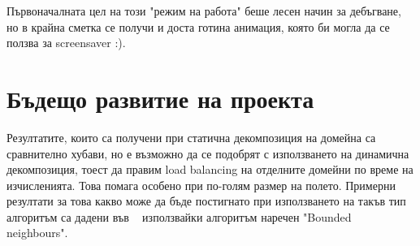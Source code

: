 \documentclass{article}
\begin{document}
Първоначалната цел на този "режим на работа" беше лесен начин за дебъгване,
но в крайна сметка се получи и доста готина анимация, която би могла да се ползва за screensaver :).

\section{Бъдещо развитие на проекта}
Резултатите, които са получени при статична декомпозиция на домейна са сравнително хубави,
но е възможно да се подобрят с използването на динамична декомпозиция, тоест да правим
load balancing на отделните домейни по време на изчисленията. Това помага особено при
по-голям размер на полето. Примерни резултати за това какво може да бъде постигнато при
използването на такъв тип алгоритъм са дадени във ~\cite{bounded_neighbours} използвайки
алгоритъм наречен "Bounded neighbours".
{}

\end{document}
